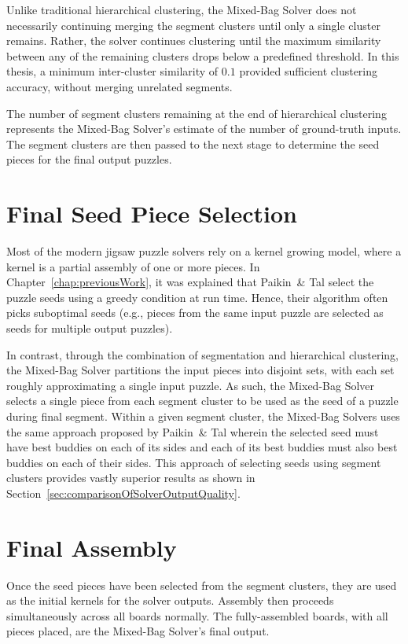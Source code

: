 Unlike traditional hierarchical clustering, the Mixed-Bag Solver does not necessarily continuing merging the segment clusters  until only a single cluster remains. Rather, the solver continues clustering until the maximum similarity between any of the remaining clusters drops below a predefined threshold.  In this thesis, a minimum inter-cluster similarity of $0.1$ provided sufficient clustering accuracy, without merging unrelated segments.

The number of segment clusters remaining at the end of hierarchical clustering represents the Mixed-Bag Solver's estimate of the number of ground-truth inputs.  The segment clusters are then passed to the next stage to determine the seed pieces for the final output puzzles.

\section{Final Seed Piece Selection}\label{sec:finalSeedPiece}

Most of the modern jigsaw puzzle solvers \cite{pomeranz2011, sholomon2013, paikin2015} rely on a kernel growing model, where a kernel is a partial assembly of one or more pieces. In Chapter~\ref{chap:previousWork}, it was explained that Paikin~\& Tal select the puzzle seeds using a greedy condition at run time. Hence, their algorithm often picks suboptimal seeds (e.g., pieces from the same input puzzle are selected as seeds for multiple output puzzles). 

In contrast, through the combination of segmentation and hierarchical clustering, the Mixed-Bag Solver partitions the input pieces into disjoint sets, with each set roughly approximating a single input puzzle.  As such, the Mixed-Bag Solver selects a single piece from each segment cluster to be used as the seed of a puzzle during final segment.  Within a given segment cluster, the Mixed-Bag Solvers uses the same approach proposed by Paikin~\& Tal wherein the selected seed must have best buddies on each of its sides and each of its best buddies must also best buddies on each of their sides.  This approach of selecting seeds using segment clusters provides vastly superior results as shown in Section~\ref{sec:comparisonOfSolverOutputQuality}.

\section{Final Assembly}

Once the seed pieces have been selected from the segment clusters, they are used as the initial kernels for the solver outputs.  Assembly then proceeds simultaneously across all boards normally.  The fully-assembled boards, with all pieces placed, are the Mixed-Bag Solver's final output.